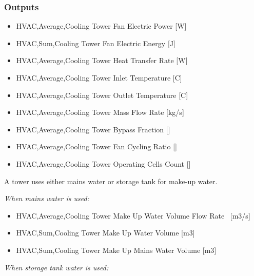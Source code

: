 \subsubsection{Outputs}\label{outputs-004}

\begin{itemize}
\item
  HVAC,Average,Cooling Tower Fan Electric Power {[}W{]}
\item
  HVAC,Sum,Cooling Tower Fan Electric Energy {[}J{]}
\item
  HVAC,Average,Cooling Tower Heat Transfer Rate {[}W{]}
\item
  HVAC,Average,Cooling Tower Inlet Temperature {[}C{]}
\item
  HVAC,Average,Cooling Tower Outlet Temperature {[}C{]}
\item
  HVAC,Average,Cooling Tower Mass Flow Rate {[}kg/s{]}
\item
  HVAC,Average,Cooling Tower Bypass Fraction {[]}
\item
  HVAC,Average,Cooling Tower Fan Cycling Ratio {[]}
\item
  HVAC,Average,Cooling Tower Operating Cells Count {[]}
\end{itemize}

A tower uses either mains water or storage tank for make-up water.

\emph{When mains water is used:}

\begin{itemize}
\item
  HVAC,Average,Cooling Tower Make Up Water Volume Flow Rate~ {[}m3/s{]}
\item
  HVAC,Sum,Cooling Tower Make Up Water Volume {[}m3{]}
\item
  HVAC,Sum,Cooling Tower Make Up Mains Water Volume {[}m3{]}
\end{itemize}

\emph{When storage tank water is used:}


